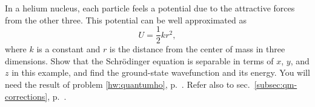 In a helium nucleus, each particle feels a potential due to the attractive
forces from the other three. This potential can be well approximated as
\begin{equation*}
  U = \frac{1}{2}kr^2,
\end{equation*}
where $k$ is a constant and $r$ is the distance from the center of mass in three dimensions.
Show that the Schr\"odinger equation is separable in terms of $x$, $y$, and $z$ in this example, and
find the ground-state wavefunction and its energy. You will need the result of problem
\ref{hw:quantumho}, p.~\pageref{hw:quantumho}. Refer also to sec.~\ref{subsec:qm-corrections},
p.~\pageref{subsec:qm-corrections}.
